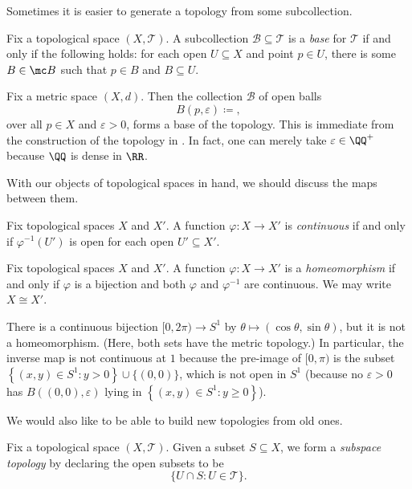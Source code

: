 \documentclass[../notes.tex]{subfiles}
\begin{document}
Sometimes it is easier to generate a topology from some subcollection.
\begin{definition}[base]
	Fix a topological space $(X,\mathcal T)$. A subcollection $\mathcal B\subseteq\mathcal T$ is a \textit{base} for $\mathcal T$ if and only if the following holds: for each open $U\subseteq X$ and point $p\in U$, there is some $B\in\mc B$ such that $p\in B$ and $B\subseteq U$.
\end{definition}
\begin{example}
	Fix a metric space $(X,d)$. Then the collection $\mathcal B$ of open balls
	\[B(p,\varepsilon)\coloneqq,\]
	over all $p\in X$ and $\varepsilon>0$, forms a base of the topology. This is immediate from the construction of the topology in . In fact, one can merely take $\varepsilon\in\QQ^+$ because $\QQ$ is dense in $\RR$.
\end{example}
With our objects of topological spaces in hand, we should discuss the maps between them.
\begin{definition}[continuous]
	Fix topological spaces $X$ and $X'$. A function $\varphi\colon X\to X'$ is \textit{continuous} if and only if $\varphi^{-1}(U')$ is open for each open $U'\subseteq X'$.
\end{definition}
\begin{definition}[homeomorphism]
	Fix topological spaces $X$ and $X'$. A function $\varphi\colon X\to X'$ is a \textit{homeomorphism} if and only if $\varphi$ is a bijection and both $\varphi$ and $\varphi^{-1}$ are continuous. We may write $X\cong X'$.
\end{definition}
\begin{remark}
	There is a continuous bijection $[0,2\pi)\to S^1$ by $\theta\mapsto(\cos\theta,\sin\theta)$, but it is not a homeomorphism. (Here, both sets have the metric topology.) In particular, the inverse map is not continuous at $1$ because the pre-image of $[0,\pi)$ is the subset $\left\{(x,y)\in S^1:y>0\right\}\cup\{(0,0)\}$, which is not open in $S^1$ (because no $\varepsilon>0$ has $B((0,0),\varepsilon)$ lying in $\left\{(x,y)\in S^1:y\ge0\right\}$).
\end{remark}
We would also like to be able to build new topologies from old ones.
\begin{definition}[subspace]
	Fix a topological space $(X,\mathcal T)$. Given a subset $S\subseteq X$, we form a \textit{subspace topology} by declaring the open subsets to be
	\[\{U\cap S:U\in\mathcal T\}.\]
\end{definition}
\end{document}
